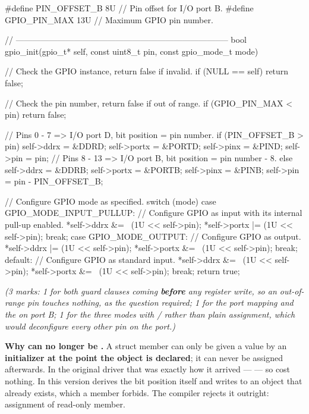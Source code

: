 \begin{ccode}
#define PIN_OFFSET_B 8U  // Pin offset for I/O port B.
#define GPIO_PIN_MAX 13U // Maximum GPIO pin number.

// -----------------------------------------------------------------------------
bool gpio_init(gpio_t* self, const uint8_t pin, const gpio_mode_t mode)
{
    // Check the GPIO instance, return false if invalid.
    if (NULL == self) { return false; }

    // Check the pin number, return false if out of range.
    if (GPIO_PIN_MAX < pin) { return false; }

    // Pins 0 - 7 => I/O port D, bit position = pin number.
    if (PIN_OFFSET_B > pin)
    {
        self->ddrx  = &DDRD;
        self->portx = &PORTD;
        self->pinx  = &PIND;
        self->pin   = pin;
    }
    // Pins 8 - 13 => I/O port B, bit position = pin number - 8.
    else
    {
        self->ddrx  = &DDRB;
        self->portx = &PORTB;
        self->pinx  = &PINB;
        self->pin   = pin - PIN_OFFSET_B;
    }

    // Configure GPIO mode as specified.
    switch (mode)
    {
        case GPIO_MODE_INPUT_PULLUP:
            // Configure GPIO as input with its internal pull-up enabled.
            *self->ddrx &= ~(1U << self->pin);
            *self->portx |= (1U << self->pin);
            break;
        case GPIO_MODE_OUTPUT:
            // Configure GPIO as output.
            *self->ddrx |= (1U << self->pin);
            *self->portx &= ~(1U << self->pin);
            break;
        default:
            // Configure GPIO as standard input.
            *self->ddrx &= ~(1U << self->pin);
            *self->portx &= ~(1U << self->pin);
            break;
    }
    return true;
}
\end{ccode}

{\itshape (3 marks: 1 for both guard clauses coming \textbf{before} any register write, so an
out-of-range pin touches nothing, as the question required; 1 for the port mapping and the
 on port B; 1 for the three modes with \code{|=}/\code{&= ~} rather than plain
assignment, which would deconfigure every other pin on the port.)\par}

 \textbf{Why  can no longer be .} A  struct
member can only be given a value by an \textbf{initializer at the point the object is declared}; it
can never be assigned afterwards. In the original driver that was exactly how it arrived ---
 --- so  cost nothing. In this version
 derives the bit position itself and writes 
to an object that already exists, which a  member forbids. The compiler rejects it
outright: assignment of read-only member. 

